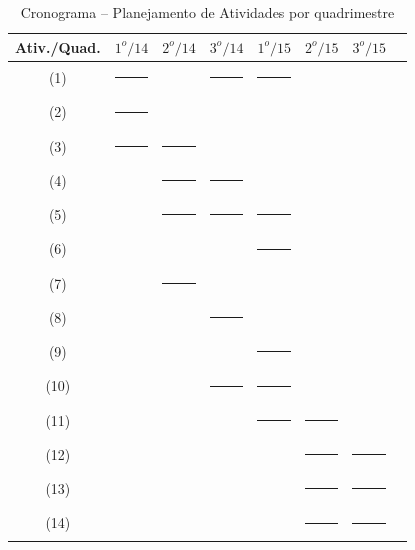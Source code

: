 \documentclass[a4paper,11pt,brazil,fleqn]{article}
\begin{document}
\begin{table}[!ht]
\begin{center}
\caption[Cronograma]{Cronograma -- Planejamento de Atividades por quadrimestre}
\begin{tabular}{|c|c|c|c|c|c|c|c|} 
	\hline
	\rule[-2mm]{0mm}{6mm}
	Ativ./Quad. & $1^o/14$ & $2^o/14$ & $3^o/14$ & $1^o/15$ & $2^o/15$ & $3^o/15$ \\
	\hline
	\rule[-2mm]{0mm}{6mm}
	(1) & \rule[0mm]{10mm}{2mm} & & \rule[0mm]{10mm}{2mm} & \rule[0mm]{10mm}{2mm} &  &   \\
	\rule[-1mm]{0mm}{5mm}
	(2) & \rule[0mm]{10mm}{2mm} &  &  &  &  &   \\
	\rule[-1mm]{0mm}{5mm}
	(3) & \rule[0mm]{10mm}{2mm} & \rule[0mm]{10mm}{2mm} &  &  &  
	&  \\
	\rule[-1mm]{0mm}{5mm}
	(4) &  & \rule[0mm]{10mm}{2mm}  & \rule[0mm]{10mm}{2mm}  &  &  & \\
	\rule[-1mm]{0mm}{5mm}
	(5) &   & \rule[0mm]{10mm}{2mm} & \rule[0mm]{10mm}{2mm} & \rule[0mm]{10mm}{2mm} &  & \\
	\rule[-1mm]{0mm}{5mm}
	(6) &   &  &  & \rule[0mm]{10mm}{2mm} &  &  \\
	\rule[-1mm]{0mm}{5mm}
	(7) &  & \rule[0mm]{10mm}{2mm} &  &  &  & \\ 
	\rule[-1mm]{0mm}{5mm}
	(8) &  &  & \rule[0mm]{10mm}{2mm} &  &  & \\
	\rule[-1mm]{0mm}{5mm}
	(9) &  &  &  & \rule[0mm]{10mm}{2mm} &  & \\
	\rule[-1mm]{0mm}{5mm}
	(10) &  &  & \rule[0mm]{10mm}{2mm} & \rule[0mm]{10mm}{2mm} &  & \  \\
	\rule[-2mm]{0mm}{6mm}
	(11) &  &  &  & \rule[0mm]{10mm}{2mm} & \rule[0mm]{10mm}{2mm} &   \\
	\rule[-2mm]{0mm}{6mm}
	(12) &  &  &  &  & \rule[0mm]{10mm}{2mm} & \rule[0mm]{10mm}{2mm}  \\
	\rule[-2mm]{0mm}{6mm}
	(13) &  &  &  &  & \rule[0mm]{10mm}{2mm} & \rule[0mm]{10mm}{2mm}  \\
	\rule[-2mm]{0mm}{6mm}
	(14) &  &  &  &  & \rule[0mm]{10mm}{2mm} & \rule[0mm]{10mm}{2mm}  \\
	\hline
\end{tabular} 
\label{crono}
\end{center}
\end{table}





{} 



\end{document}
